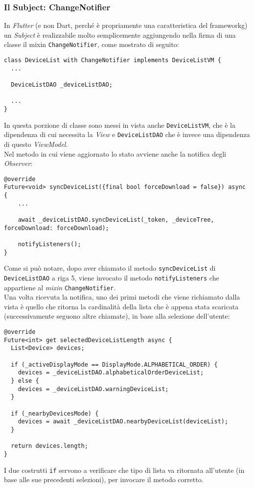 \subsubsection{Il Subject: ChangeNotifier}
\label{subsubsec:subject-changenotifier}

In \emph{Flutter} (e non Dart, perché è propriamente una caratteristica del \gls{frameworkg}) un \emph{Subject} è realizzabile molto semplicemente aggiungendo nella firma di una classe il mixin \texttt{ChangeNotifier}, come mostrato di seguito:

\begin{lstlisting}
class DeviceList with ChangeNotifier implements DeviceListVM {
  ...

  DeviceListDAO _deviceListDAO;
  
  ...
}
\end{lstlisting}
In questa porzione di classe sono messi in vista anche \texttt{DeviceListVM}, che è la dipendenza di cui necessita la \emph{View} e \texttt{DeviceListDAO} che è invece una dipendenza di questo \emph{ViewModel}.\\
Nel metodo in cui viene aggiornato lo stato avviene anche la notifica degli \emph{Observer}:
\begin{lstlisting}
@override
Future<void> syncDeviceList({final bool forceDownload = false}) async {
    ...

    await _deviceListDAO.syncDeviceList(_token, _deviceTree, forceDownload: forceDownload);

    notifyListeners();
}
\end{lstlisting}
Come si può notare, dopo aver chiamato il metodo \texttt{syncDeviceList} di \texttt{DeviceListDAO} a riga 5, viene invocato il metodo \texttt{notifyListeners} che appartiene al \emph{mixin} \texttt{ChangeNotifier}.\\
Una volta ricevuta la notifica, uno dei primi metodi che viene richiamato dalla vista è quello che ritorna la cardinalità della lista che è appena stata scaricata (successivamente seguono altre chiamate), in base alla selezione dell'utente:
\begin{lstlisting}
@override
Future<int> get selectedDeviceListLength async {
  List<Device> devices;

  if (_activeDisplayMode == DisplayMode.ALPHABETICAL_ORDER) {
    devices = _deviceListDAO.alphabeticalOrderDeviceList;
  } else {
    devices = _deviceListDAO.warningDeviceList;
  }

  if (_nearbyDevicesMode) {
    devices = await _deviceListDAO.nearbyDeviceList(deviceList);
  }

  return devices.length;
}
\end{lstlisting}
I due costrutti \texttt{if} servono a verificare che tipo di lista va ritornata all'utente (in base alle sue precedenti selezioni), per invocare il metodo corretto.

